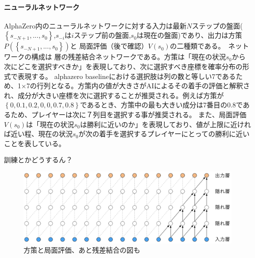 \paragraph{ニューラルネットワーク}
AlphaZero内のニューラルネットワークに対する入力は最新$N$ステップの盤面($\left\{ s_{-N+1}, ..., s_0 \right\}$,$s_{-i}$は$i$ステップ前の盤面,$s_{0}$は現在の盤面)であり、出力は方策$P(\left\{ s_{-N+1}, ..., s_0 \right\})$と
局面評価（後で確認）$V(s_0)$の二種類である。\
ネットワークの構成は 層の残差結合ネットワークである。方策は「現在の状況$s_0$から次にどこを選択すべきか」を表現しており、次に選択すべき座標を確率分布の形式で表現する。
alphazero baselineにおける選択肢は列の数と等しい7であるため、1$\times$7の行列となる。方策内の値が大きさがAIによるその着手の評価と解釈され、成分が大きい座標を次に選択することが推奨される。例えば方策が
$\left\{0, 0.1, 0.2, 0, 0, 0.7, 0.8\right\}$であるとき、方策中の最も大きい成分は7番目の0.8であるため、プレイヤーは次に７列目を選択する事が推奨される。
また、局面評価$V(s_0)$は「現在の状況$s_0$は勝利に近いのか」を表現しており、値が上限に近ければ近い程、現在の状況$s_0$が次の着手を選択するプレイヤーにとっての勝利に近いことを表している。

訓練とかどうするん？
\begin{figure}[t]
	\centering
	\includegraphics[width=\linewidth]{./figure/ccl.png}
	\caption{方策と局面評価、あと残差結合の図も}
	\label{fig:ccl}
\end{figure}
